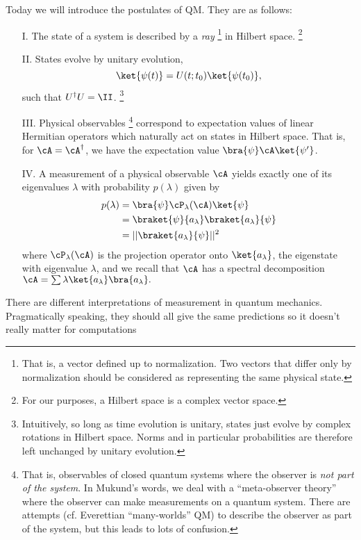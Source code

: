 Today we will introduce the postulates of QM. They are as follows:
\begin{enumerate}
    \item[I.] The state of a system is described by a \emph{ray}%
        \footnote{That is, a vector defined up to normalization. Two vectors that differ only by normalization should be considered as representing the same physical state.}
    in Hilbert space.%
        \footnote{For our purposes, a Hilbert space is a complex vector space.}
    \item[II.] States evolve by unitary evolution,
    \begin{equation}
        \ket{\psi(t)}=U(t;t_0) \ket{\psi(t_0)},
    \end{equation}
    such that $U^\dagger U= \II$.%
        \footnote{Intuitively, so long as time evolution is unitary, states just evolve by complex rotations in Hilbert space. Norms and in particular probabilities are therefore left unchanged by unitary evolution.}
    \item[III.] Physical observables%
        \footnote{That is, observables of closed quantum systems where the observer is \emph{not part of the system}. In Mukund's words, we deal with a ``meta-observer theory'' where the observer can make measurements on a quantum system. There are attempts (cf. Everettian ``many-worlds'' QM) to describe the observer as part of the system, but this leads to lots of confusion.}
    correspond to expectation values of linear Hermitian operators which naturally act on states in Hilbert space. That is, for $\cA=\cA^\dagger$, we have the expectation value $\bra{\psi}\cA\ket{\psi'}$.
    \item[IV.]  A measurement of a physical observable $\cA$ yields exactly one of its eigenvalues $\lambda$ with probability $p(\lambda)$ given by 
    \begin{align*}
        p(\lambda)&=\bra{\psi} \cP_\lambda(\cA)\ket{\psi}\\
            &= \braket{\psi}{a_\lambda} \braket{a_\lambda}{\psi}\\
            &= ||\braket{a_\lambda}{\psi}||^2
    \end{align*}
    where $\cP_\lambda(\cA)$ is the projection operator onto $\ket{a_\lambda}$, the eigenstate with eigenvalue $\lambda$, and we recall that $\cA$ has a spectral decomposition $\cA=\sum \lambda \ket{a_\lambda}\bra{a_\lambda}.$
\end{enumerate}
There are different interpretations of measurement in quantum mechanics. Pragmatically speaking, they should all give the same predictions so it doesn't really matter for computations%
